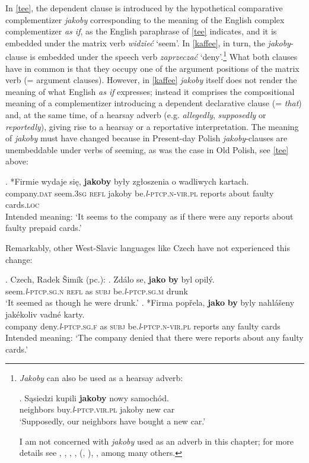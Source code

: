 \documentclass[output=paper
,modfonts
,nonflat]{langsci/langscibook}
\newcommand{\glossformat}[1]{\textsc{#1}}
\newcommand{\thirdperson}{\glossformat{3}\xspace}
\newcommand{\dat}{\glossformat{dat}\xspace}
\newcommand{\fem}{\glossformat{f}\xspace}
\newcommand{\loc}{\glossformat{loc}\xspace}
\newcommand{\lptcp}{\emph{l}\glossformat{-ptcp}\xspace}
\newcommand{\masc}{\glossformat{m}\xspace}
\newcommand{\n}{\glossformat{n}\xspace}
\newcommand{\nvir}{\glossformat{n-vir}\xspace}
\newcommand{\pl}{\glossformat{pl}\xspace}
\newcommand{\refl}{\glossformat{refl}\xspace}
\newcommand{\sg}{\glossformat{sg}\xspace}
\newcommand{\subj}{\glossformat{subj}\xspace}
\newcommand{\vir}{\glossformat{vir}\xspace}
\begin{document}
In \ref{tee}, the dependent clause is introduced by the hypothetical comparative complementizer \emph{jakoby} corresponding to the meaning of the English complex complementizer \emph{as if}, as the English paraphrase of \ref{tee} indicates, and it is embedded under the matrix verb \emph{widzieć} `seem'. In \ref{kaffee}, in turn, the \emph{jakoby}-clause is embedded under the speech verb \emph{zaprzeczać} `deny'.\footnote{\emph{Jakoby} can also be used as a hearsay adverb:

\exg.		Sąsiedzi kupili \textbf{jakoby} nowy samochód. \label{adverb} \\
		neighbors buy.{\lptcp}.{\vir}.{\pl} jakoby new car \\
		`Supposedly, our neighbors have bought a new car.'

I am not concerned with \emph{jakoby} used as an adverb in this chapter; for more details see \textcite{Jedrzejowski2012}, \textcite{Socka2010}, \textcite{Stepien2008}, \textcite{Wiemer2015}, \citeauthor{Wiemer-Socka2017} (\citeyear{Wiemer-Socka2017}, \citeyear{Wiemer-Socka2017a}), \textcite{Zabowska2008}, among many others.
} 
What both clauses have in common is that they occupy one of the argument positions of the matrix verb (= argument clauses). However, in \ref{kaffee} \emph{jakoby} itself does not render the meaning of what English \emph{as if} expresses; instead it comprises the compositional meaning of a complementizer introducing a dependent declarative clause (= \emph{that}) and, at the same time, of a hearsay adverb (e.g. \emph{allegedly}, \emph{supposedly} or \emph{reportedly}), giving rise to a hearsay or a reportative interpretation. The meaning of \emph{jakoby} must have changed because in Present-day Polish \emph{jakoby}-clauses are unembeddable under verbs of seeming, as was the case in Old Polish, see \ref{tee} above:


\exg.		*Firmie wydaje się, \textbf{jakoby} były zgłoszenia o wadliwych kartach. \label{seem_jakoby} \\       
		company.{\dat} seem.{\thirdperson}{\sg} {\refl} jakoby be.{\lptcp}.{\nvir}.{\pl} reports about faulty cards.{\loc} \\
		Intended meaning: `It seems to the company as if there were any reports about faulty prepaid cards.'    

Remarkably, other West-Slavic languages like Czech have not experienced this change: 

\ex.	Czech, Radek Šimík (pc.):
	\ag.	Zdálo se, \textbf{jako} \textbf{by} byl opilý. \\
		seem.{\lptcp}.{\sg}.{\n} {\refl} as {\subj} be.{\lptcp}.{\sg}.{\masc} drunk \\
		`It seemed as though he were drunk.'
	\bg.	*Firma popřela, \textbf{jako} \textbf{by} byly nahlášeny jakékoliv vadné karty. \label{nogo} \\
		company deny.{\lptcp}.{\sg}.{\fem} as {\subj} be.{\lptcp}.{\nvir}.{\pl} reports any faulty cards \\
		 Intended meaning: `The company denied that there were reports about any faulty cards.' 
\end{document}
